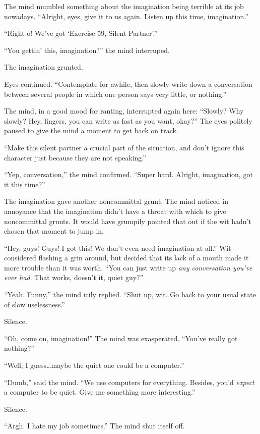 \documentclass[10pt]{article}
\begin{document}
The mind mumbled something about the imagination being terrible at its
job nowadays.  ``Alright, eyes, give it to us again.  Listen up this
time, imagination.''

``Right-o!  We've got `Exercise 59, Silent Partner'.''

``You gettin' this, imagination?'' the mind interruped.

The imagination grunted.

Eyes continued.  ``Contemplate for awhile, then slowly write down a
conversation between several people in which one person says very
little, or nothing.''

The mind, in a good mood for ranting, interrupted again here: ``Slowly?
Why slowly?  Hey, fingers, you can write as fast as you want, okay?''
The eyes politely paused to give the mind a moment to get back on track.

``Make this silent partner a crucial part of the situation, and don't
ignore this character just because they are not speaking.''

``Yep, conversation,'' the mind confirmed. ``Super hard.  Alright,
imagination, got it this time?''

The imagination gave another noncommittal grunt.  The mind noticed in
annoyance that the imagination didn't have a throat with which to give
noncommittal grunts.  It would have grumpily pointed that out if the wit
hadn't chosen that moment to jump in.

``Hey, guys! Guys! I got this! We don't even need imagination at all.''
Wit considered flashing a grin around, but decided that its lack of a
mouth made it more trouble than it was worth.  ``You can just write up
\emph{any conversation you've ever had}.  That works, doesn't it, quiet
guy?''

``Yeah. Funny,'' the mind icily replied. ``Shut up, wit. Go back to
your usual state of slow uselessness.''

Silence.

``Oh, come on, imagination!'' The mind was exasperated. ``You've really
got nothing?''

``Well, I guess\ldots maybe the quiet one could be a computer.''

``Dumb,'' said the mind.  ``We use computers for everything.  Besides,
you'd \emph{expect} a computer to be quiet.  Give me something more
interesting.''

Silence.

``Argh.  I hate my job sometimes.''  The mind shut itself off.
\end{document}
